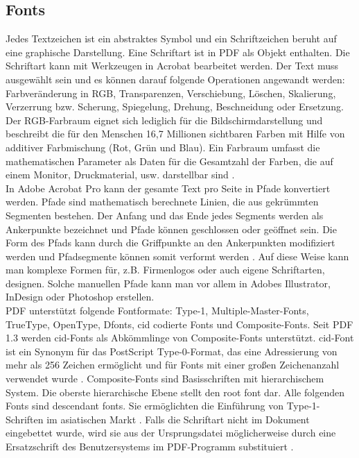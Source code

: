 \subsection{Fonts}
Jedes Textzeichen ist ein abstraktes Symbol und ein Schriftzeichen beruht auf eine graphische Darstellung. Eine Schriftart ist in PDF als Objekt enthalten. Die Schriftart kann mit Werkzeugen in Acrobat bearbeitet werden. Der Text muss ausgewählt sein und es können darauf folgende Operationen angewandt werden: Farbveränderung in RGB, Transparenzen, Verschiebung, Löschen, Skalierung, Verzerrung bzw. Scherung, Spiegelung, Drehung, Beschneidung oder Ersetzung. Der RGB-Farbraum eignet sich lediglich für die Bildschirmdarstellung und beschreibt die für den Menschen 16,7 Millionen sichtbaren Farben mit Hilfe von additiver Farbmischung (Rot, Grün und Blau). Ein Farbraum umfasst die mathematischen Parameter als Daten für die Gesamtzahl der Farben, die auf einem Monitor, Druckmaterial, usw. darstellbar sind \cite{farbraum}. \\
In Adobe Acrobat Pro kann der gesamte Text pro Seite in Pfade konvertiert werden. Pfade sind mathematisch berechnete Linien, die aus gekrümmten Segmenten bestehen. Der Anfang und das Ende jedes Segments werden als Ankerpunkte bezeichnet und Pfade können geschlossen oder geöffnet sein. Die Form des Pfads kann durch die Griffpunkte an den Ankerpunkten modifiziert werden und Pfadsegmente können somit verformt werden \cite{adobe-pfade}. Auf diese Weise kann man komplexe Formen für, z.B. Firmenlogos oder auch eigene Schriftarten, designen. Solche manuellen Pfade kann man vor allem in Adobes Illustrator, InDesign oder Photoshop erstellen. \\ 
PDF unterstützt folgende Fontformate: Type-1, Multiple-Master-Fonts, TrueType, OpenType, Dfonts, \gls{cid} codierte Fonts und Composite-Fonts. Seit PDF 1.3 werden \gls{cid}-Fonts als Abkömmlinge von Composite-Fonts unterstützt. \gls{cid}-Font ist ein Synonym für das PostScript Type-0-Format, das eine Adressierung von mehr als 256 Zeichen ermöglicht und für Fonts mit einer großen Zeichenanzahl verwendet wurde \cite{typoinfo}. Composite-Fonts sind Basisschriften mit hierarchischem System. Die oberste hierarchische Ebene stellt den root font dar. Alle folgenden Fonts sind descendant fonts. Sie ermöglichten die Einführung von Type-1-Schriften im asiatischen Markt \cite{schneeberger}. Falls die Schriftart nicht im Dokument eingebettet wurde, wird sie aus der Ursprungsdatei möglicherweise durch eine Ersatzschrift des Benutzersystems im PDF-Programm substituiert \cite{schneeberger}. 

